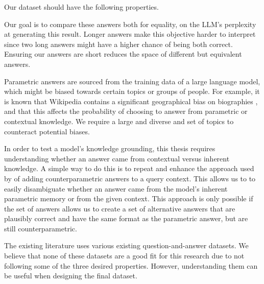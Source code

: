 Our dataset should have the following properties.
\begin{description}[style=nextline,topsep=-5pt]
	\item[1. Questions should have short, unambiguous answers.]
		Our goal is to compare these answers both for equality, on the LLM's perplexity at generating this result. Longer answers make this objective harder to interpret since two long answers might have a higher chance of being both correct. Ensuring our answers are short reduces the space of different but equivalent answers.
	\item[2. Questions must cover a large and diverse set of topics.]
		Parametric answers are sourced from the training data of a large language model, which might be biased towards certain topics or groups of people. For example, it is known that Wikipedia contains a significant geographical bias on biographies \citep{wikipedia_geographic_bias}, and that this affects the probability of choosing to answer from parametric or contextual knowledge\citep{factual_recall}.
		We require a large and diverse and set of topics to counteract potential biases.
	\item[3. Questions must allow for the creation of counterparametric answers.]
		In order to test a model's knowledge grounding, this thesis requires understanding whether an answer came from contextual versus inherent knowledge.
	    A simple way to do this is to repeat and enhance the approach used by \citeauthor{factual_recall} of adding counterparametric answers to a query context.
		This allows us to to easily disambiguate whether an answer came from the model's inherent parametric memory or from the given context.
	    This approach is only possible if the set of answers allows us to create a set of alternative answers that are plausibly correct and have the same format as the parametric answer, but are still counterparametric.
\end{description}

The existing literature uses various existing question-and-answer datasets.
We believe that none of these datasets are a good fit for this research due to not following some of the three desired properties.
However, understanding them can be useful when designing the final dataset.


